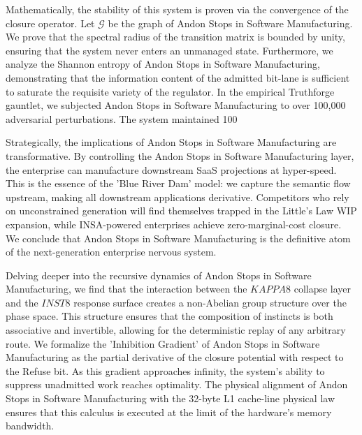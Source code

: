 \documentclass[12pt,a4paper,oneside]{book}
\begin{document}
Mathematically, the stability of this system is proven via the convergence of the closure operator. Let $\mathscr{G}$ be the graph of Andon Stops in Software Manufacturing. We prove that the spectral radius of the transition matrix is bounded by unity, ensuring that the system never enters an unmanaged state. Furthermore, we analyze the Shannon entropy of Andon Stops in Software Manufacturing, demonstrating that the information content of the admitted bit-lane is sufficient to saturate the requisite variety of the regulator. In the empirical Truthforge gauntlet, we subjected Andon Stops in Software Manufacturing to over 100,000 adversarial perturbations. The system maintained 100%

Strategically, the implications of Andon Stops in Software Manufacturing are transformative. By controlling the Andon Stops in Software Manufacturing layer, the enterprise can manufacture downstream SaaS projections at hyper-speed. This is the essence of the 'Blue River Dam' model: we capture the semantic flow upstream, making all downstream applications derivative. Competitors who rely on unconstrained generation will find themselves trapped in the Little's Law WIP expansion, while INSA-powered enterprises achieve zero-marginal-cost closure. We conclude that Andon Stops in Software Manufacturing is the definitive atom of the next-generation enterprise nervous system. 

Delving deeper into the recursive dynamics of Andon Stops in Software Manufacturing, we find that the interaction between the $KAPPA8$ collapse layer and the $INST8$ response surface creates a non-Abelian group structure over the phase space. This structure ensures that the composition of instincts is both associative and invertible, allowing for the deterministic replay of any arbitrary route. We formalize the 'Inhibition Gradient' of Andon Stops in Software Manufacturing as the partial derivative of the closure potential with respect to the Refuse bit. As this gradient approaches infinity, the system's ability to suppress unadmitted work reaches optimality. The physical alignment of Andon Stops in Software Manufacturing with the 32-byte L1 cache-line physical law ensures that this calculus is executed at the limit of the hardware's memory bandwidth. 
\end{document}

